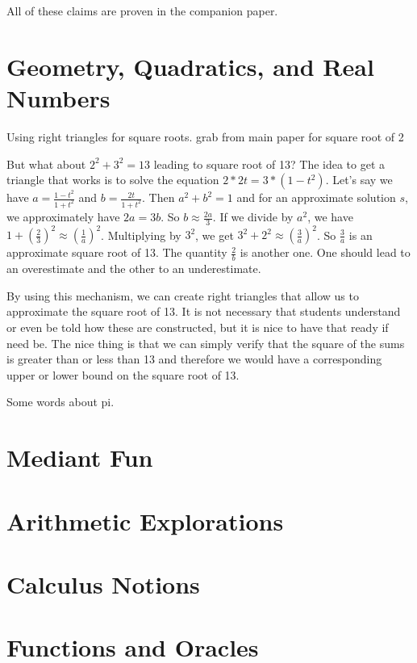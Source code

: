 \documentclass[12pt]{article}
\theoremstyle{remark}
\begin{document}
All of these claims are proven in the companion paper. 



\section{Geometry, Quadratics, and Real Numbers}

Using right triangles for square roots. grab from main paper for square root of 2

But what about $2^2 + 3^2 = 13$ leading to square root of 13?  The idea to get a triangle that works is to solve the equation $2 * 2t = 3 * (1-t^2)$. Let's say we have $a=\frac{1-t^2}{1+t^2}$ and $b = \frac{2t}{1+t^2}$.  Then $a^2 + b^2 = 1$ and for an approximate solution $s$, we approximately have $2a = 3b$. So $b \approx \frac{2a}{3}$. If we divide by $a^2$, we have $1 + (\frac{2}{3})^2 \approx (\frac{1}{a})^2$. Multiplying by $3^2$, we get $3^2 + 2^2 \approx (\frac{3}{a})^2$. So $\frac{3}{a}$ is an approximate square root of 13. The quantity $\frac{2}{b}$ is another one. One should lead to an overestimate and the other to an underestimate. 

By using this mechanism, we can create right triangles that allow us to approximate the square root of 13. It is not necessary that students understand or even be told how these are constructed, but it is nice to have that ready if need be. The nice thing is that we can simply verify that the square of the sums is greater than or less than 13 and therefore we would have a corresponding upper or lower bound on the square root of 13.


Some words about pi. 

\section{Mediant Fun}

\section{Arithmetic Explorations}

\section{Calculus Notions}

\section{Functions and Oracles}
\end{document}

